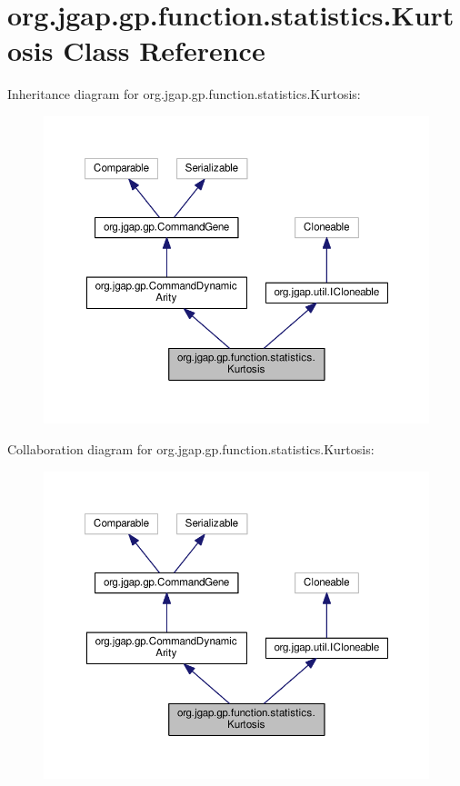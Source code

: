 \hypertarget{classorg_1_1jgap_1_1gp_1_1function_1_1statistics_1_1_kurtosis}{\section{org.\-jgap.\-gp.\-function.\-statistics.\-Kurtosis Class Reference}
\label{classorg_1_1jgap_1_1gp_1_1function_1_1statistics_1_1_kurtosis}
}


Inheritance diagram for org.\-jgap.\-gp.\-function.\-statistics.\-Kurtosis\-:
\nopagebreak
\begin{figure}[H]
\begin{center}
\leavevmode
\includegraphics[width=350pt]{classorg_1_1jgap_1_1gp_1_1function_1_1statistics_1_1_kurtosis__inherit__graph}
\end{center}
\end{figure}


Collaboration diagram for org.\-jgap.\-gp.\-function.\-statistics.\-Kurtosis\-:
\nopagebreak
\begin{figure}[H]
\begin{center}
\leavevmode
\includegraphics[width=350pt]{classorg_1_1jgap_1_1gp_1_1function_1_1statistics_1_1_kurtosis__coll__graph}
\end{center}
\end{figure}
